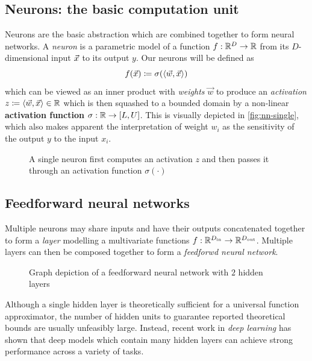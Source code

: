\documentclass[dissertation.tex]{subfiles}
\begin{document}
\subsection{Neurons: the basic computation unit}

Neurons are the basic abstraction which are combined together to form
neural networks. A \emph{neuron} is a parametric model of a function $f : \mathbb{R}^D \to
\mathbb{R}$ from its $D$-dimensional input $\vec{x}$ to its output $y$. Our neurons will be
defined as
\begin{equation}
    f(\vec{x}) \coloneqq \sigma( \langle \vec{w}, \vec{x} \rangle)
\end{equation}
which can be viewed as an inner product with \emph{weights} $\vec{w}$ to
produce an \emph{activation} $z \coloneqq \langle \vec{w}, \vec{x} \rangle
\in \mathbb{R}$ which is then squashed to a bounded domain by a non-linear
\textbf{activation function} $\sigma : \mathbb{R} \to [L, U]$. This is visually
depicted in \autoref{fig:nn-single}, which also makes apparent the
interpretation of weight $w_i$ as the sensitivity of the output $y$ to the
input $x_i$.

\begin{figure}[htpb]
    \centering
    
    \caption{A single neuron first computes an activation $z$ and then passes it through
    an activation function $\sigma(\cdot)$}
    \label{fig:nn-single}
\end{figure}

\subsection{Feedforward neural networks}

Multiple neurons may share inputs and have their outputs concatenated together
to form a \emph{layer} modelling a multivariate functions $f :
\mathbb{R}^{D_\text{in}} \to \mathbb{R}^{D_\text{out}}$. Multiple layers can then
be composed together to form a \emph{feedforwd neural network}.

\begin{figure}[htpb]
    \centering
    
    \caption{Graph depiction of a feedforward neural network with $2$ hidden layers}
    \label{fig:nn-ffw}
\end{figure}

Although a single hidden layer is theoretically sufficient for a universal
function approximator\cite{Cybenko1993}, the number of hidden units to
guarantee reported theoretical bounds are usually unfeasibly large. Instead,
recent work in \emph{deep learning} has shown that deep models which contain
many hidden layers can achieve strong performance across a variety of
tasks\cite{Bengio2011}.
\end{document}
